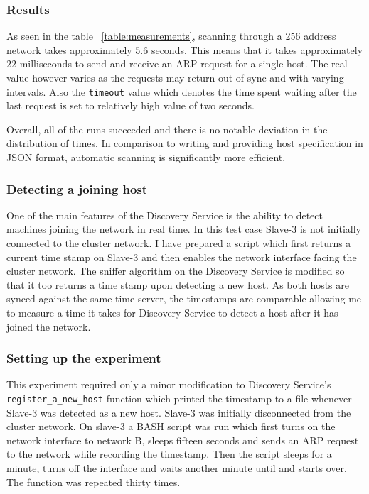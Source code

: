 \subsubsection*{Results}

As seen in the table ~\ref{table:measurements}, scanning through a 256 address network takes approximately 5.6 seconds. This means that it takes approximately 22 milliseconds to send and receive an ARP request for a single host. The real value however varies as the requests may return out of sync and with varying intervals. Also the \verb|timeout| value which denotes the time spent waiting after the last request is set to relatively high value of two seconds.

Overall, all of the runs succeeded and there is no notable deviation in the distribution of times. In comparison to writing and providing host specification in JSON format, automatic scanning is significantly more efficient.

\subsubsection{Detecting a joining host} \label{joining_host}

One of the main features of the Discovery Service is the ability to detect machines joining the network in real time. In this test case Slave-3 is not initially connected to the cluster network. I have prepared a script which first returns a current time stamp on Slave-3 and then enables the network interface facing the cluster network. The sniffer algorithm on the Discovery Service is modified so that it too returns a time stamp upon detecting  a new host. As both hosts are synced against the same time server, the timestamps are comparable allowing me to measure a time it takes for Discovery Service to detect a host after it has joined the network.

\subsubsection*{Setting up the experiment}

This experiment required only a minor modification to Discovery Service's \verb|register_a_new_host| function which printed the timestamp to a file whenever Slave-3 was detected as a new host. Slave-3 was initially disconnected from the cluster network. On slave-3 a BASH script was run which first turns on the network interface to network B, sleeps fifteen seconds and sends an ARP request to the network while recording the timestamp. Then the script sleeps for a minute, turns off the interface and waits another minute until and starts over. The function was repeated thirty times.

